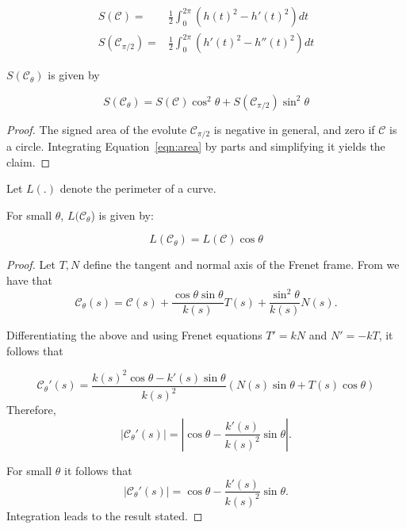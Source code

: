   \begin{align*}
  S(\mathcal{C})=&\frac{1}{2} \int_0^{2\pi}( h(t)^2-h'(t)^2) dt\\
  S(\mathcal{C}_{\pi/2})=&\frac{1}{2} \int_0^{2\pi}( h'(t)^2-h''(t)^2) dt
  \end{align*}
  
 \begin{proposition}
 $S(\mathcal{C}_\theta)$ is given by
  	
  	\[ S(\mathcal{C}_\theta)= S(\mathcal{C})\cos^2\theta+S(\mathcal{C}_{\pi/2})\sin^2\theta\]
\end{proposition}

\begin{proof}
The signed area of the evolute $\mathcal{C}_{\pi/2}$ is negative in general, and zero if $\mathcal{C}$ is a circle. Integrating Equation~\ref{eqn:area} by parts and simplifying it yields the claim.
\end{proof}


Let $L(.)$ denote the perimeter of a curve.

\begin{proposition}
For small $\theta$, $L(\mathcal{C}_{\theta}$) is given by:
	
	\[L(\mathcal{C}_{\theta} )=L(\mathcal{C})\cos{  \theta} \]
\end{proposition}

\begin{proof} Let $T,N$ define the tangent and normal axis of the Frenet frame. From \cite{giblin_2014} we have that
	\[  \mathcal{C}_{\theta}(s)=\mathcal{C}(s)+\frac{\cos\theta\sin\theta}{k(s)}T(s)+\frac{ \sin^2\theta}{k(s)}N(s).\]
	
Differentiating the above and using Frenet equations $T'={k}N$ and $N'=-{k}T$, it follows that
	
\[ \mathcal{C}_{\theta}'(s)=\frac{ k(s)  ^{2}\cos{\theta} -  k'(s)\sin{\theta}}{ k(s) ^{2}}  \left( N(s) \sin{\theta}+T(s) \cos{\theta} \right) 
	\]
	Therefore,
	\[ |\mathcal{C}_{\theta}'(s)|= |\cos\theta -\frac{k'(s)}{k(s)^2}\sin\theta| .\]
	
	For small $\theta$ it follows that
		\[ |\mathcal{C}_{\theta}'(s)|= \cos\theta -\frac{k'(s)}{k(s)^2}\sin\theta.\]
	Integration leads to the result stated.  
\end{proof}

